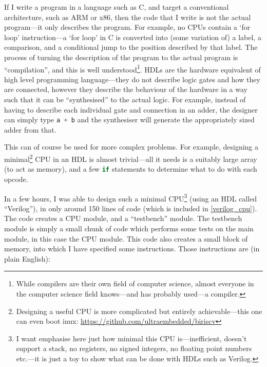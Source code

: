 \documentclass[12pt]{article}
\begin{document}
If I write a program in a language such as C, and target a conventional architecture, such as ARM or x86, then the code that I write is not the actual program---it only describes the program. For example, no CPUs contain a `for loop' instruction---a `for loop' in C is converted into (some variation of) a label, a comparison, and a conditional jump to the position described by that label. The process of turning the description of the program to the actual program is ``compilation'', and this is well understood\footnote{While compilers are their own field of computer science, almost everyone in the computer science field knows---and has probably used---a compiler.}.
HDLs are the hardware equivalent of high level programming language---they do not describe logic gates and how they are connected, however they describe the behaviour of the hardware in a way such that it can be ``synthesised'' to the actual logic. For example, instead of having to describe each individual gate and connection in an adder, the designer can simply type \lstinline[language=Verilog]|a + b| and the synthesiser will generate the appropriately sized adder from that.

This can of course be used for more complex problems. For example, designing a minimal\footnote{Designing a useful CPU is more complicated but entirely achievable---this one can even boot inux: \url{https://github.com/ultraembedded/biriscv}} CPU in an HDL is almost trivial---all it needs is a suitably large array (to act as memory), and a few \lstinline[language=Verilog]|if| statements to determine what to do with each opcode.

In a few hours, I was able to design such a minimal CPU\footnote{I want emphasise here just how minimal this CPU is---inefficient, doesn't support a stack, no registers, no signed integers, no floating point numbers etc.\@---it is just a toy to show what can be done with HDLs such as Verilog.} (using an HDL called ``Verilog''), in only around 150 lines of code (which is included in \ref{verilog_cpu}). The code creates a CPU module, and a ``testbench'' module. The testbench module is simply a small chunk of code which performs some tests on the main module, in this case the CPU module. This code also creates a small block of memory, into which I have specified some instructions. Those instructions are (in plain English):
\end{document}
